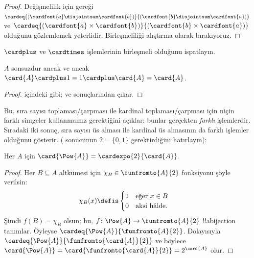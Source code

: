 \documentclass[../../../include/open-logic-section]{subfiles}
\begin{document}
\begin{proof}
Değişmelilik için
 gereği
$\cardeq{(\cardfont{a} \disjointsum
\cardfont{b})}{(\cardfont{b} \disjointsum \cardfont{a})}$ ve
$\cardeq{(\cardfont{a} \times \cardfont{b})}{(\cardfont{b} \times
\cardfont{a})}$ olduğunu gözlemlemek yeterlidir. Birleşmeliliği alıştırma
olarak bırakıyoruz.
\end{proof}

\begin{prob}
$\cardplus$ ve $\cardtimes$ işlemlerinin birleşmeli olduğunu ispatlayın.
\end{prob}

\begin{prop}
$A$ sonsuzdur ancak ve ancak
$\card{A} \cardplus 1 = 1 \cardplus \card{A} = \card{A}$.
\end{prop}

\begin{proof}
 içindeki gibi;
 ve
 sonuçlarından
çıkar.
\end{proof}

Bu, sıra sayısı toplaması/çarpması ile kardinal toplaması/çarpması için
niçin farklı simgeler kullanmamız gerektiğini açıklar: bunlar gerçekten
\emph{farklı} işlemlerdir. Sıradaki iki sonuç, sıra sayısı üs alması ile
kardinal üs almasının da farklı işlemler olduğunu gösterir.
( sonucunun $2=\{0,1\}$ gerektirdiğini
hatırlayın):

\begin{lem}
Her $A$ için $\card{\Pow{A}} = \cardexpo{2}{\card{A}}$.
\end{lem}

\begin{proof}
Her $B\subseteq A$ altkümesi için $\chi_B\in\funfromto{A}{2}$ fonksiyonu
şöyle verilsin:
\begin{align*}
	\chi_{B}(x) &\defis
	\begin{cases}
		1 & \text{eğer }x\in B\\
		0 & \text{aksi hâlde.}
	\end{cases}
\end{align*}
Şimdi $f(B)=\chi_B$ olsun; bu, $f\colon\Pow{A}\to
\funfromto{A}{2}$ !!a{bijection} tanımlar. Öyleyse
$\cardeq{\Pow{A}}{\funfromto{A}{2}}$. Dolayısıyla
$\cardeq{\Pow{A}}{\funfromto{\card{A}}{2}}$ ve böylece
$\card{\Pow{A}} = \card{\funfromto{\card{A}}{2}} =
2^{\card{A}}$ olur.
\end{proof}
\end{document}
